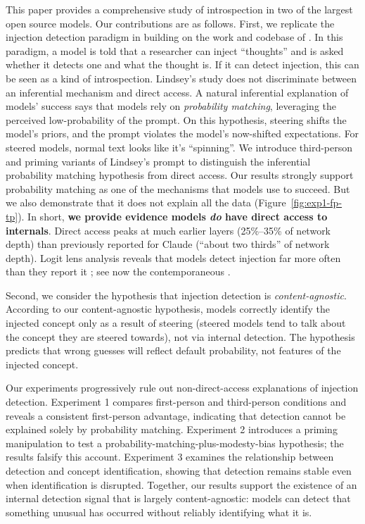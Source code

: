 \documentclass{article}
\begin{document}
This paper provides a comprehensive study of introspection in two of the largest open source models.
Our contributions are as follows. First, we replicate the injection detection paradigm in \citet{lindsey_introspection_2025} building on the work and codebase of \citet{parikh_introspection_2025}. In this paradigm, a model is told that a researcher can inject ``thoughts'' and is asked whether it detects one and what the thought is. If it can detect injection, this can be seen as a kind of introspection. Lindsey's study does not discriminate between an inferential mechanism and direct access.
A natural inferential explanation of models' success says that models rely on \emph{probability matching}, leveraging the perceived low-probability of the prompt. On this  hypothesis, steering shifts the model's priors, and the prompt violates the model's now-shifted expectations. For steered models, normal text looks like it's ``spinning''. We introduce third-person and priming variants of Lindsey's prompt to distinguish the inferential probability matching hypothesis from direct access. Our results strongly support probability matching as one of the mechanisms that models use to succeed. But we also demonstrate that it does not explain all the data (Figure~\ref{fig:exp1-fp-tp}). In short, \textbf{we provide evidence models \textit{do} have direct access to internals}. Direct access peaks at much earlier layers (25\%--35\% of network depth) than previously reported for Claude (``about two thirds'' of network depth). Logit lens analysis reveals that models detect injection far more often than they report it \citep{vogel_small_2025}; see now the contemporaneous  \citet{pearson-vogel_latent_2026}.

Second, we consider the hypothesis that injection detection is \emph{content-agnostic}. According to our content-agnostic hypothesis, models correctly identify the injected concept only as a result of steering (steered models tend to talk about the concept they are steered towards), not via internal detection. The hypothesis predicts that wrong guesses will reflect default probability, not features of the injected concept. 

Our experiments progressively rule out non-direct-access explanations of injection detection. Experiment 1 compares first-person and third-person conditions and reveals a consistent first-person advantage, indicating that detection cannot be explained solely by probability matching. Experiment 2 introduces a priming manipulation to test a probability-matching-plus-modesty-bias hypothesis; the results falsify this account. Experiment 3 examines the relationship between detection and concept identification, showing that detection remains stable even when identification is disrupted. Together, our results support the existence of an internal detection signal that is largely content-agnostic: models can detect that something unusual has occurred without reliably identifying what it is.
\end{document}
